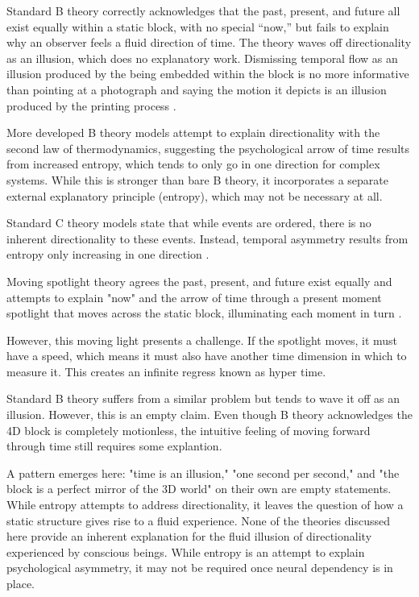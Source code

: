 \documentclass[11pt,a4paper]{article}
\begin{document}
Standard B theory correctly acknowledges that the past, present, and future all exist equally within a static block, with no special “now,” but fails to explain why an observer feels a fluid direction of time. The theory waves off directionality as an illusion, which does no explanatory work. Dismissing temporal flow as an illusion produced by the being embedded within the block is no more informative than pointing at a photograph and saying the motion it depicts is an illusion produced by the printing process \citep{mctaggart1908unreality}.

More developed B theory models attempt to explain directionality with the second law of thermodynamics, suggesting the psychological arrow of time results from increased entropy, which tends to only go in one direction for complex systems. While this is stronger than bare B theory, it incorporates a separate external explanatory principle (entropy), which may not be necessary at all. 

Standard C theory models state that while events are ordered, there is no inherent directionality to these events. Instead, temporal asymmetry results from entropy only increasing in one direction \citep{Dummett1960-DUMADO}.

Moving spotlight theory agrees the past, present, and future exist equally and attempts to explain "now" and the arrow of time through a present moment spotlight that moves across the static block, illuminating each moment in turn \citep{skow2009relativity}.

However, this moving light presents a challenge. If the spotlight moves, it must have a speed, which means it must also have another time dimension in which to measure it. This creates an infinite regress known as hyper time.

Standard B theory suffers from a similar problem but tends to wave it off as an illusion. However, this is an empty claim. Even though B theory acknowledges the 4D block is completely motionless, the intuitive feeling of moving forward through time still requires some explantion.

A pattern emerges here: "time is an illusion," "one second per second," and "the block is a perfect mirror of the 3D world" on their own are empty statements. While entropy attempts to address directionality, it leaves the question of how a static structure gives rise to a fluid experience. None of the theories discussed here provide an inherent explanation for the fluid illusion of directionality experienced by conscious beings. While entropy is an attempt to explain psychological asymmetry, it may not be required once neural dependency is in place.
\end{document}
